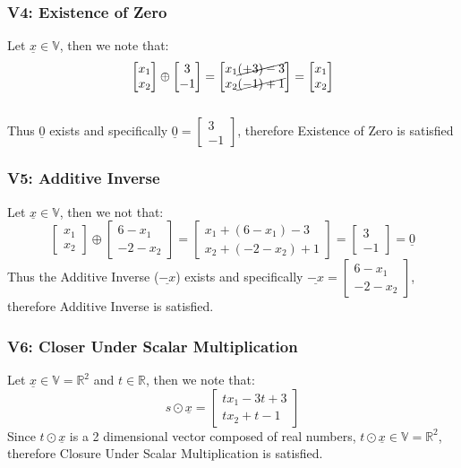 \documentclass{article}
\begin{document}
\subsubsection*{V4: Existence of Zero}
Let $\underline{x}\in \mathbb{V}$, then we note that:$$\begin{bmatrix} 
x_{1}\\x_{2}
\end{bmatrix}\oplus\begin{bmatrix} 
3\\-1
\end{bmatrix}=\begin{bmatrix} 
x_{1}\cancel{(+3)-3}\\
x_{2}\cancel{(-1)+1}
\end{bmatrix}=\begin{bmatrix} 
x_{1}\\x_{2}
\end{bmatrix}$$\\
Thus $\underline{0}$ exists and specifically $\underline{0}=\begin{bmatrix} 
3\\-1
\end{bmatrix}$, therefore Existence of Zero is satisfied
\subsubsection*{V5: Additive Inverse}
Let $\underline{x}\in\mathbb{V}$, then we not that: $$\begin{bmatrix} 
x_{1}\\
x_{2}
\end{bmatrix}\oplus\begin{bmatrix} 
6-x_{1}\\-2-x_{2}
\end{bmatrix}=\begin{bmatrix} 
x_{1}+(6-x_{1})-3\\
x_{2}+(-2-x_{2})+1
\end{bmatrix}=\begin{bmatrix} 
3\\-1
\end{bmatrix}=\underline{0}$$
Thus the Additive Inverse ($\underline{-x}$) exists and specifically $\underline{-x}=\begin{bmatrix} 
6-x_{1}\\
-2-x_{2}
\end{bmatrix}$, therefore Additive Inverse is satisfied.
\subsubsection*{V6: Closer Under Scalar Multiplication}
Let $\underline{x}\in \mathbb{V}=\mathbb{R}^{2}$ and $t \in \mathbb{R}$, then we note that: $$s\odot \underline{x}=\begin{bmatrix} 
tx_{1}-3t+3\\
tx_{2}+t-1
\end{bmatrix}$$
Since $t\odot \underline{x}$ is a 2 dimensional vector composed of real numbers, $t \odot \underline{x}\in \mathbb{V}=\mathbb{R}^{2}$, therefore Closure Under Scalar Multiplication is satisfied.
\end{document}
